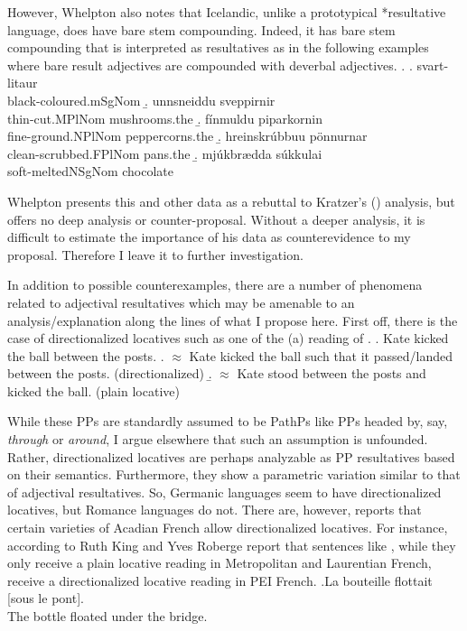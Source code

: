 \documentclass[MilwayThesis]{subfiles}
\begin{document}
However, Whelpton also notes that Icelandic, unlike a prototypical *resultative	language, does have bare stem compounding.
Indeed, it has bare stem compounding that is interpreted as resultatives as in the following examples where bare result adjectives are compounded with deverbal adjectives.
\ex. 
\a. svart-lita\dh{}ur\\
black-coloured.mSgNom
\b. \th{}unnsneiddu sveppirnir\\
thin-cut.MPlNom mushrooms.the
\b. f\'{i}nmuldu piparkornin\\
fine-ground.NPlNom peppercorns.the
\b. hreinskr\'{u}bbu\dh{}u p\"{o}nnurnar\\
clean-scrubbed.FPlNom pans.the
\b. mj\'{u}kbr\ae{}dda s\'{u}kkula\dh{}i\\
soft-meltedNSgNom chocolate

Whelpton presents this and other data as a rebuttal to Kratzer's (\citeyear{kratzer2004building}) analysis, but offers no deep analysis or counter-proposal.
Without a deeper analysis, it is difficult to estimate the importance of his data as counterevidence to my proposal.
Therefore I leave it to further investigation.

In addition to possible counterexamples, there are a number of phenomena related to adjectival resultatives which may be amenable to an analysis/explanation along the lines of what I propose here.
First off, there is the case of directionalized locatives such as one of the (a) reading of \Next.
\ex. Kate kicked the ball between the posts.
\a. $\approx$ Kate kicked the ball such that it passed/landed between the posts. (directionalized)
\b. $\approx$ Kate stood between the posts and kicked the ball. (plain locative)

While these PPs are standardly assumed to be PathPs like PPs headed by, say, \textit{through} or \textit{around}, I argue elsewhere \parencite{milway20xxmodifying} that such an assumption is unfounded.
Rather, directionalized locatives are perhaps analyzable as PP resultatives based on their semantics.
Furthermore, they show a parametric variation similar to that of adjectival resultatives.
So, Germanic languages seem to have directionalized locatives, but Romance languages do not.
There are, however, reports that certain varieties of Acadian French allow directionalized locatives.
For instance, according to Ruth King and Yves Roberge \parencite[p.c. cited in][253--254]{rooryck1996prepositions} report that sentences like \Next, while they only receive a plain locative reading in Metropolitan and Laurentian French, receive a directionalized locative reading in PEI French.
\ex.La bouteille flottait [sous le pont].\\
The bottle floated under the bridge. \parencite{rooryck1996prepositions}
\end{document}
